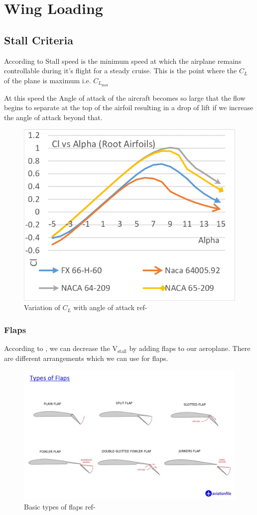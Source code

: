 \documentclass[12 pt]{article}
\begin{document}
\section{Wing Loading}

\subsection{Stall Criteria}
According to \cite{stall1} Stall speed is the minimum speed at which the airplane remains controllable during it's flight for a steady cruise. This is the point where the $C_L$ of the plane is maximum i.e. $C_{L_{\text{max}}}$

At this speed the Angle of attack of the aircraft becomes so large that the flow begins to separate at the top of the airfoil resulting in a drop of lift if we increase the angle of attack beyond that.

\begin{figure}[h]
    \centering
    \includegraphics[width=0.4\linewidth]{Extra pics/Cllvsalpha.png}
    \caption{Variation of $C_L$ with angle of attack ref- \cite{stallpic}}
    \label{Variation of $C_L$ with angle}
\end{figure}



\subsubsection{Flaps}
According to \cite{flap}, we can decrease the $\text{V}_\text{stall}$ by adding flaps to our aeroplane. There are different arrangements which we can use for flaps.

\begin{figure}
    \centering
    \includegraphics[width=0.5\linewidth]{Extra pics/flap-types.jpg}
    \caption{Basic types of flaps ref- \cite{flap} }
    \label{Different Flap types}
\end{figure}
\end{document}

